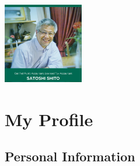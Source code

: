 


\vspace*{-20mm}　　 %
\hfill
\begin{minipage}[t]{35mm}
\includegraphics[width=35mm]{shirokanecpa.png}
\end{minipage}

\vspace{-35mm}
\section{My Profile}

\subsection{Personal Information}

